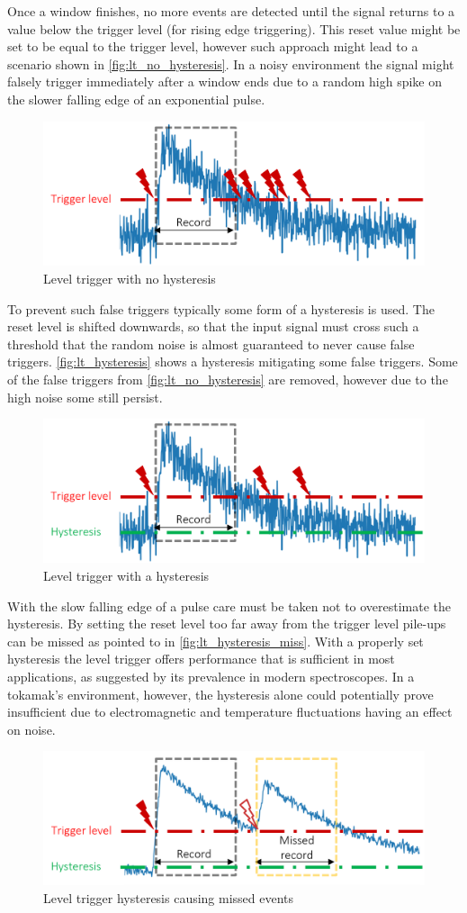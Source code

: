 Once a window finishes, no more events are detected
until the signal returns to a value below the trigger level
(for rising edge triggering). This reset value might be 
set to be equal to the trigger level, however such approach
might lead to a scenario shown in \autoref{fig:lt_no_hysteresis}.
In a noisy environment the signal might falsely trigger immediately after
a window ends due to a random high spike on the slower falling edge of
an exponential pulse.
\begin{figure}[H]
  \centering
  \includegraphics[width=.6\linewidth]{media/lt_no_hysteresis.png}
  \caption{Level trigger with no hysteresis}
  \label{fig:lt_no_hysteresis}
\end{figure}

To prevent such false triggers typically some form of a hysteresis is used.
The reset level is shifted downwards, so that the input signal must cross
such a threshold that the random noise is almost guaranteed to never cause false 
triggers. \autoref{fig:lt_hysteresis} shows a hysteresis mitigating some false triggers.
Some of the false triggers from \autoref{fig:lt_no_hysteresis} are removed, however 
due to the high noise some still persist.
\begin{figure}[H]
  \centering
  \includegraphics[width=.6\linewidth]{media/lt_hysteresis.png}
  \caption{Level trigger with a hysteresis}
  \label{fig:lt_hysteresis} 
\end{figure}

With the slow falling edge of a pulse care must be taken not to 
overestimate the hysteresis. By setting the reset level too far away
from the trigger level pile-ups can be missed as pointed to in
\autoref{fig:lt_hysteresis_miss}. With a properly set hysteresis
the level trigger offers performance that is sufficient in most applications,
as suggested by its prevalence in modern spectroscopes.
In a tokamak's environment, however, the hysteresis
alone could potentially prove insufficient due to 
electromagnetic and temperature fluctuations having an effect on noise.
\begin{figure}[H]
  \centering
  \includegraphics[width=.6\linewidth]{media/lt_hysteresis_miss.png}
  \caption{Level trigger hysteresis causing missed events}
  \label{fig:lt_hysteresis_miss} 
\end{figure}
